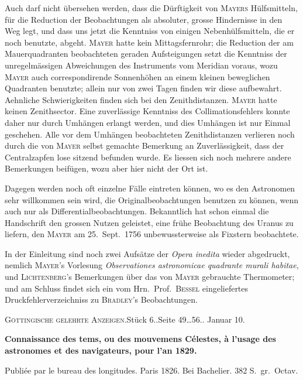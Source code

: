 \documentclass[12pt,a4paper]{article}
\newcommand{\anzeigeheading}[4]{%
    \begin{center}
    \small\textsc{G\"ottingische gelehrte Anzeigen.}\quad St\"uck #1.\quad Seite #2.\quad #3
    \end{center}
    \vspace{-2mm}
    \begin{center}\small\textbf{#4}\end{center}
    \vspace{2mm}
}
\begin{document}
Auch darf nicht \"ubersehen werden, dass die D\"urftigkeit von \textsc{Mayers} H\"ulfsmitteln, f\"ur die Reduction der Beobachtungen als absoluter, grosse Hindernisse in den Weg legt, und dass uns jetzt die Kenntniss von einigen Nebenh\"ulfsmitteln, die er noch benutzte, abgeht. \textsc{Mayer} hatte kein Mittagsfernrohr; die Reduction der am Mauerquadranten beobachteten geraden Aufsteigungen setzt die Kenntniss der unregelm\"assigen Abweichungen des Instruments vom Meridian voraus, wozu \textsc{Mayer} auch correspondirende Sonnenh\"ohen an einem kleinen beweglichen Quadranten benutzte; allein nur von zwei Tagen finden wir diese aufbewahrt. Aehnliche Schwierigkeiten finden sich bei den Zenithdistanzen. \textsc{Mayer} hatte keinen Zenithsector. Eine zuverl\"assige Kenntniss des Collimationsfehlers konnte daher nur durch Umh\"angen erlangt werden, und dies Umh\"angen ist nur Einmal geschehen. Alle vor dem Umh\"angen beobachteten Zenithdistanzen verlieren noch durch die von \textsc{Mayer} selbst gemachte Bemerkung an Zuverl\"assigkeit, dass der Centralzapfen lose sitzend befunden wurde. Es liessen sich noch mehrere andere Bemerkungen beif\"ugen, wozu aber hier nicht der Ort ist.

Dagegen werden noch oft einzelne F\"alle eintreten k\"onnen, wo es den Astronomen sehr willkommen sein wird, die Originalbeobachtungen benutzen zu k\"onnen, wenn auch nur als Differentialbeobachtungen. Bekanntlich hat schon einmal die Handschrift den grossen Nutzen geleistet, eine fr\"uhe Beobachtung des Uranus zu liefern, den \textsc{Mayer} am 25.\ Sept.\ 1756 unbewussterweise als Fixstern beobachtete.

In der Einleitung sind noch zwei Aufs\"atze der \textit{Opera inedita} wieder abgedruckt, nemlich \textsc{Mayer}'s Vorlesung \textit{Observationes astronomicae quadrante murali habitae}, und \textsc{Lichtenberg}'s Bemerkungen \"uber das von \textsc{Mayer} gebrauchte Thermometer; und am Schluss findet sich ein vom Hrn.\ Prof.\ \textsc{Bessel} eingeliefertes Druckfehlerverzeichniss zu \textsc{Bradley}'s Beobachtungen.

\anzeigeheading{6.}{49\dots 56.}{1828 Januar 10.}{Connaissance des tems, ou des mouvemens C\'elestes, \`a l'usage des astronomes et des navigateurs, pour l'an 1829.}

\begin{otherlanguage}{french}
\noindent\small Publi\'ee par le bureau des longitudes. Paris 1826. Bei Bachelier. 382 S.\ gr.\ Octav.
\end{otherlanguage}
\end{document}
